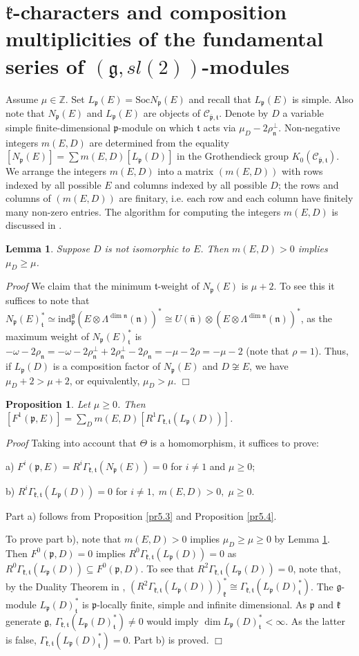 \documentclass[11pt]{amsart}
\newcounter{theorem}
\newtheorem{lemma}[theo]{Lemma}
\newtheorem{prop}[theo]{Proposition}
\renewenvironment{proof}{ \emph{Proof}}{$\Box$}
\renewcommand{\tt}{\mathfrak{t}}
\newcommand{\kk}{\mathfrak{k}}
\newcommand{\nn}{\mathfrak{n}}
\newcommand{\pp}{\mathfrak{p}}
\renewcommand{\gg}{\mathfrak{g}}
\newcommand{\refle}[1]{Lemma \ref{#1}}
\newcommand{\refprop}[1]{Proposition \ref{#1}}
\newcommand{\Soc}{\mathrm{Soc}}
\newcommand{\ind}{\mathrm{ind}}
\newcommand{\field}[1]{\mathbb{#1}}
\begin{document}
\section{$\kk$-characters and composition multiplicities of the fundamental series of $(\gg,sl(2))$-modules}

Assume $\mu\in\field{Z}$. Set $L_\pp(E) = \Soc N_\pp(E)$ and recall that $L_\pp(E)$ is simple. Also note that $N_\pp(E)$ and $L_\pp(E)$ are objects of $\mathcal{C}_{\bar{\pp},\tt}$. Denote by $D$ a variable simple finite-dimensional $\pp$-module on which $\tt$ acts via $\mu_D-2\rho_\nn^\perp$. Non-negative integers $m(E,D)$ are determined from the equality $[N_\pp(E)] = \sum m(E,D)[L_\pp(D)]$ in the Grothendieck group $K_0(\mathcal{C}_{\bar{\pp},\tt})$.  We arrange the integers $m(E,D)$ into a matrix $(m(E,D))$ with rows indexed by all possible $E$ and columns indexed by all possible $D$; the rows and columns of $(m(E,D))$ are finitary, i.e. each row and each column have finitely many non-zero entries. The algorithm for computing the integers $m(E,D)$ is discussed in \cite{CC}.
\begin{lemma}\label{le7.1}
Suppose $D$ is not isomorphic to $E$. Then $m(E,D)>0$ implies $\mu_D\geq\mu$.
\end{lemma}
\begin{proof}
We claim that the minimum $\tt$-weight of $N_\pp(E)$ is $\mu+2$. To see this it suffices to note that $N_\pp(E)^*_\tt\simeq\ind_\pp^\gg(E\otimes\Lambda^{\dim\nn}(\nn))^*\cong U(\bar{\nn})\otimes(E\otimes\Lambda^{\dim\nn}(\nn))^*$, as the maximum weight of $N_\pp(E)_\tt^*$ is $-\omega -2\rho_\nn=-\omega -2\rho_\nn^\perp +2\rho_\nn^\perp -2\rho_\nn=-\mu -2\rho=-\mu -2$ (note that $\rho=1$). Thus, if $L_\pp(D)$ is a composition factor of $N_\pp(E)$ and $D\not\cong E$, we have $\mu_D+2>\mu+2$, or equivalently, $\mu_D>\mu$.
\end{proof}
\begin{prop}\label{pr7.2} 
Let $\mu\geq 0$. Then $[F^1(\pp,E)] = \sum_D m(E,D) [R^1 \Gamma_{\kk,\tt} (L_\pp(D))]$.
\end{prop}
\begin{proof}
Taking into account that $\Theta$ is a homomorphism, it suffices to prove:

a) $F^i(\pp,E)=R^i\Gamma_{\kk,\tt}(N_\pp(E))=0$ for $i\neq 1$ and $\mu\geq 0$;

b) $R^i\Gamma_{\kk,\tt}(L_\pp(D))=0$ for $i\neq 1,\; m(E,D)>0,\; \mu\geq 0$.

Part a) follows from \refprop{pr5.3} and \refprop{pr5.4}. 

To prove part b), note that $m(E,D)>0$ implies $\mu_D\geq\mu\geq 0$ by \refle{le7.1}. Then $F^0(\pp,D)=0$ implies $R^0\Gamma_{\kk,\tt}(L_\pp(D))=0$ as $R^0\Gamma_{\kk,\tt}(L_\pp(D))\subseteq F^0(\pp,D)$. To see that $R^2\Gamma_{\kk,\tt}(L_\pp(D))=0$, note that, by the Duality Theorem in \cite{EW}, $(R^2\Gamma_{\kk,\tt}(L_\pp(D)))_\kk^*\cong\Gamma_{\kk,\tt}(L_\pp(D)_\tt^*)$. The $\gg$-module $L_\pp(D)_\tt^*$ is $\pp$-locally finite, simple and infinite dimensional. As $\pp$ and $\kk$ generate $\gg$, $\Gamma_{\kk,\tt}(L_\pp(D)_\tt^*)\neq 0$ would imply $\dim L_\pp(D)_\tt^*<\infty$. As the latter is false, $\Gamma_{\kk,\tt}(L_\pp(D)_\tt^*)=0$. Part b) is proved.
\end{proof}
\end{document}
